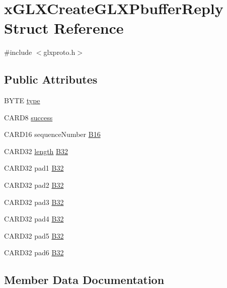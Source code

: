 \hypertarget{structx_g_l_x_create_g_l_x_pbuffer_reply}{}\section{x\+G\+L\+X\+Create\+G\+L\+X\+Pbuffer\+Reply Struct Reference}
\label{structx_g_l_x_create_g_l_x_pbuffer_reply}


{\ttfamily \#include $<$glxproto.\+h$>$}

\subsection*{Public Attributes}
\begin{DoxyCompactItemize}
\item 
B\+Y\+TE \hyperlink{structx_g_l_x_create_g_l_x_pbuffer_reply_a7a53416a3dc64db97960ae87e950bcab}{type}
\item 
C\+A\+R\+D8 \hyperlink{structx_g_l_x_create_g_l_x_pbuffer_reply_a2ef66862a809a9638a6743cf9eac3c3f}{success}
\item 
C\+A\+R\+D16 sequence\+Number \hyperlink{structx_g_l_x_create_g_l_x_pbuffer_reply_a955a22d1f0d1226d0a92fff6e2f0d922}{B16}
\item 
C\+A\+R\+D32 \hyperlink{glcorearb_8h_ab9c919755bde3b34349e23a32b4e0fa7}{length} \hyperlink{structx_g_l_x_create_g_l_x_pbuffer_reply_a96b631e886cdc877ded1f6472bd84b7a}{B32}
\item 
C\+A\+R\+D32 pad1 \hyperlink{structx_g_l_x_create_g_l_x_pbuffer_reply_abed67939ecee25ba4f4b1bfc8c764189}{B32}
\item 
C\+A\+R\+D32 pad2 \hyperlink{structx_g_l_x_create_g_l_x_pbuffer_reply_ae5681ef14616d9df9592cc2ad8b0388f}{B32}
\item 
C\+A\+R\+D32 pad3 \hyperlink{structx_g_l_x_create_g_l_x_pbuffer_reply_aae51743d4cac1bb2aabf2f845de073d6}{B32}
\item 
C\+A\+R\+D32 pad4 \hyperlink{structx_g_l_x_create_g_l_x_pbuffer_reply_a7734366390e51bff7d75437b41bf3611}{B32}
\item 
C\+A\+R\+D32 pad5 \hyperlink{structx_g_l_x_create_g_l_x_pbuffer_reply_afdaed70d7ab89cf9ab38576240a55d36}{B32}
\item 
C\+A\+R\+D32 pad6 \hyperlink{structx_g_l_x_create_g_l_x_pbuffer_reply_ad08d42296fdfbb1906dec0aa696e968f}{B32}
\end{DoxyCompactItemize}


\subsection{Member Data Documentation}
\mbox{\label{structx_g_l_x_create_g_l_x_pbuffer_reply_a955a22d1f0d1226d0a92fff6e2f0d922}} 
